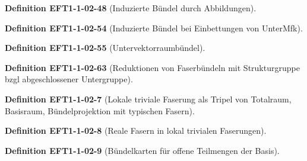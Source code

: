\documentclass[10pt, letterpaper]{article}
\newcommand{\CustomHeading}[3]{%
  \par\medskip\noindent%
  \textbf{#1 #2} \textnormal{(#3)}.\enskip%
}
\newenvironment{DEF}[2]{\CustomHeading{Definition}{#1}{#2}}{}
\begin{document}
\begin{DEF}{EFT1-1-02-48}{Induzierte Bündel durch Abbildungen}

\end{DEF}

\begin{DEF}{EFT1-1-02-54}{Induzierte Bündel bei Einbettungen von UnterMfk}

\end{DEF}

\begin{DEF}{EFT1-1-02-55}{Untervektorraumbündel}

\end{DEF}

\begin{DEF}{EFT1-1-02-63}{Reduktionen von Faserbündeln mit Strukturgruppe bzgl abgeschlossener Untergruppe}

\end{DEF}

\begin{DEF}{EFT1-1-02-7}{Lokale triviale Faserung als Tripel von Totalraum, Basisraum, Bündelprojektion mit typischen Fasern}

\end{DEF}

\begin{DEF}{EFT1-1-02-8}{Reale Fasern in lokal trivialen Faserungen}

\end{DEF}

\begin{DEF}{EFT1-1-02-9}{Bündelkarten für offene Teilmengen der Basis}

\end{DEF}
\end{document}
